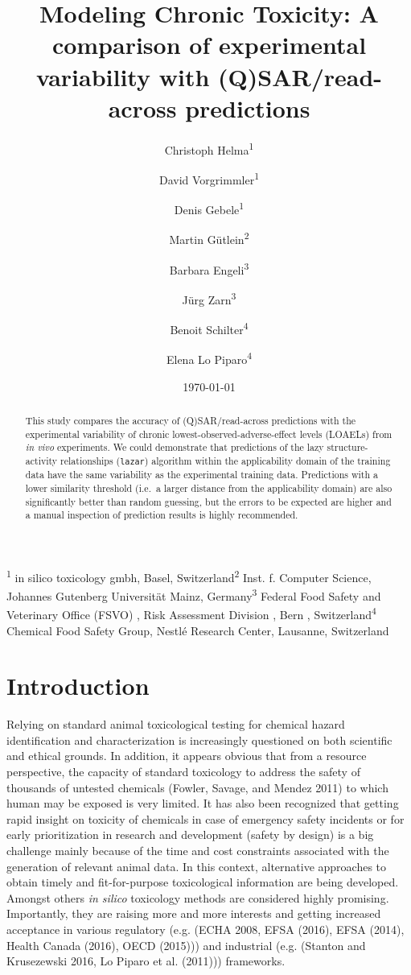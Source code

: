 \documentclass[]{achemso}
\title{Modeling Chronic Toxicity: A comparison of experimental variability with
(Q)SAR/read-across predictions}
\author{Christoph Helma\textsuperscript{1} \and David Vorgrimmler\textsuperscript{1} \and Denis Gebele\textsuperscript{1} \and Martin Gütlein\textsuperscript{2} \and Barbara Engeli\textsuperscript{3} \and Jürg Zarn\textsuperscript{3} \and Benoit Schilter\textsuperscript{4} \and Elena Lo Piparo\textsuperscript{4}}
\date{\today}
\begin{document}
\maketitle
\begin{abstract}
This study compares the accuracy of (Q)SAR/read-across predictions with
the experimental variability of chronic lowest-observed-adverse-effect
levels (LOAELs) from \emph{in vivo} experiments. We could demonstrate
that predictions of the lazy structure-activity relationships
(\texttt{lazar}) algorithm within the applicability domain of the
training data have the same variability as the experimental training
data. Predictions with a lower similarity threshold (i.e.~a larger
distance from the applicability domain) are also significantly better
than random guessing, but the errors to be expected are higher and a
manual inspection of prediction results is highly recommended.
\end{abstract}

\textsuperscript{1} in silico toxicology gmbh, Basel,
Switzerland\newline\textsuperscript{2} Inst. f. Computer Science,
Johannes Gutenberg Universität Mainz, Germany\newline\textsuperscript{3}
Federal Food Safety and Veterinary Office (FSVO) , Risk Assessment
Division , Bern , Switzerland\newline\textsuperscript{4} Chemical Food
Safety Group, Nestlé Research Center, Lausanne, Switzerland

\section{Introduction}\label{introduction}

Relying on standard animal toxicological testing for chemical hazard
identification and characterization is increasingly questioned on both
scientific and ethical grounds. In addition, it appears obvious that
from a resource perspective, the capacity of standard toxicology to
address the safety of thousands of untested chemicals (Fowler, Savage,
and Mendez 2011) to which human may be exposed is very limited. It has
also been recognized that getting rapid insight on toxicity of chemicals
in case of emergency safety incidents or for early prioritization in
research and development (safety by design) is a big challenge mainly
because of the time and cost constraints associated with the generation
of relevant animal data. In this context, alternative approaches to
obtain timely and fit-for-purpose toxicological information are being
developed. Amongst others \emph{in silico} toxicology methods are
considered highly promising. Importantly, they are raising more and more
interests and getting increased acceptance in various regulatory (e.g.
(ECHA 2008, EFSA (2016), EFSA (2014), Health Canada (2016), OECD
(2015))) and industrial (e.g. (Stanton and Krusezewski 2016, Lo Piparo
et al. (2011))) frameworks.
\end{document}
